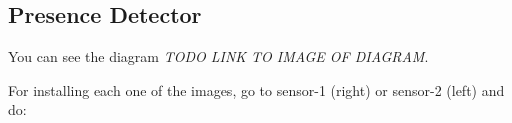 \subsection{Presence Detector}\label{presence-detector}

You can see the diagram \emph{TODO LINK TO IMAGE OF DIAGRAM}.

For installing each one of the images, go to sensor-1 (right) or
sensor-2 (left) and do:

\begin{Shaded}
\begin{Highlighting}[]

\end{Highlighting}
\end{Shaded}
